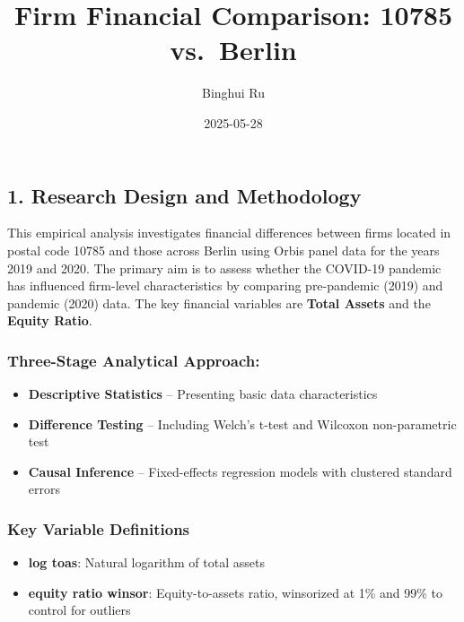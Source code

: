 \documentclass[
  12pt,
]{article}
\title{Firm Financial Comparison: 10785 vs.~Berlin}
\author{Binghui Ru}
\date{2025-05-28}
\providecommand{\tightlist}{%
  \setlength{\itemsep}{0pt}\setlength{\parskip}{0pt}}
\begin{document}
\maketitle

\subsection{1. Research Design and
Methodology}\label{research-design-and-methodology}

This empirical analysis investigates financial differences between firms
located in postal code 10785 and those across Berlin using Orbis panel
data for the years 2019 and 2020. The primary aim is to assess whether
the COVID-19 pandemic has influenced firm-level characteristics by
comparing pre-pandemic (2019) and pandemic (2020) data. The key
financial variables are \textbf{Total Assets} and the \textbf{Equity
Ratio}.

\subsubsection{Three-Stage Analytical
Approach:}\label{three-stage-analytical-approach}

\begin{itemize}
\tightlist
\item
  \textbf{Descriptive Statistics} -- Presenting basic data
  characteristics\\
\item
  \textbf{Difference Testing} -- Including Welch's t-test and Wilcoxon
  non-parametric test\\
\item
  \textbf{Causal Inference} -- Fixed-effects regression models with
  clustered standard errors
\end{itemize}

\subsubsection{Key Variable Definitions}\label{key-variable-definitions}

\begin{itemize}
\tightlist
\item
  \textbf{log toas}: Natural logarithm of total assets
\item
  \textbf{equity ratio winsor}: Equity-to-assets ratio, winsorized at
  1\% and 99\% to control for outliers
\end{itemize}
\end{document}

